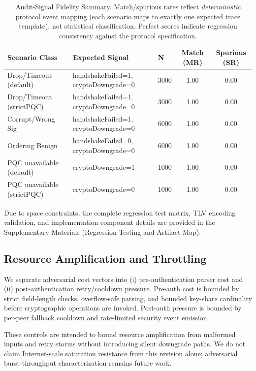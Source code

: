 \documentclass[10pt,journal,compsoc]{IEEEtran}
\begin{document}
\begin{table}[!t]
\centering
\caption{Audit-Signal Fidelity Summary. Match/spurious rates reflect \emph{deterministic} protocol event mapping (each scenario maps to exactly one expected trace template), not statistical classification. Perfect scores indicate regression consistency against the protocol specification.}
\label{tab:audit-signal-fidelity}
\begin{tabular}{@{}lllcc@{}}
\toprule
Scenario Class & Expected Signal & N & Match (MR) & Spurious (SR) \\
\midrule
Drop/Timeout (default) & handshakeFailed=1, cryptoDowngrade=0 & 3000 & 1.00 & 0.00 \\
Drop/Timeout (strictPQC) & handshakeFailed=1, cryptoDowngrade=0 & 3000 & 1.00 & 0.00 \\
Corrupt/Wrong Sig & handshakeFailed=1, cryptoDowngrade=0 & 6000 & 1.00 & 0.00 \\
Ordering Benign & handshakeFailed=0, cryptoDowngrade=0 & 6000 & 1.00 & 0.00 \\
PQC unavailable (default) & cryptoDowngrade=1 & 1000 & 1.00 & 0.00 \\
PQC unavailable (strictPQC) & cryptoDowngrade=0 & 1000 & 1.00 & 0.00 \\
\bottomrule
\end{tabular}
\end{table}

Due to space constraints, the complete regression test matrix, TLV encoding validation, and implementation component details are provided in the Supplementary Materials (Regression Testing and Artifact Map).

\subsection{Resource Amplification and Throttling}\label{sec:resource-amplification}

We separate adversarial cost vectors into (i) pre-authentication parser
cost and (ii) post-authentication retry/cooldown pressure. Pre-auth
cost is bounded by strict field-length checks, overflow-safe parsing, and
bounded key-share cardinality before cryptographic operations are
invoked. Post-auth pressure is bounded by per-peer fallback cooldown and
rate-limited security event emission.

These controls are intended to bound resource amplification from malformed
inputs and retry storms without introducing silent downgrade paths. We do
not claim Internet-scale saturation resistance from this revision alone;
adversarial burst-throughput characterization remains future work.
\end{document}
